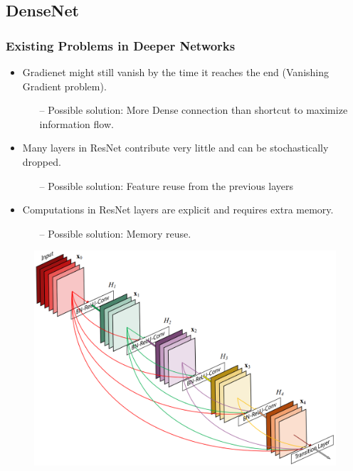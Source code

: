 \documentclass[9pt]{beamer}
\begin{document}
\subsection{DenseNet}
\begin{frame}
	\frametitle{Existing Problems in Deeper Networks}
	\begin{itemize}
		\item Gradienet might still vanish by the time it reaches the end (Vanishing Gradient problem).
		\begin{itemize}
			\item[--] \textcolor{green!70!black} {Possible solution: More Dense connection than shortcut to maximize information flow.} 
		\end{itemize}
		\item Many layers in ResNet contribute very little and can be stochastically dropped.
		\begin{itemize}
			\item[--] \textcolor{green!70!black} {Possible solution: Feature reuse from the previous layers} 
		\end{itemize}		
		\item Computations in ResNet layers are explicit and requires extra memory.
		\begin{itemize}
			\item[--] \textcolor{green!70!black} {Possible solution: Memory reuse.} 
		\end{itemize}
	\end{itemize}
	\pause
	\begin{figure}
		\includegraphics[scale=0.13]{./figures/edit/densenet_01.png}
	\end{figure}
\end{frame}
\end{document}

